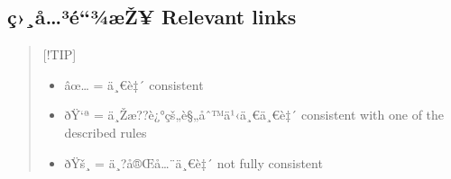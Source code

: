 \subsection{ç›¸å\ldots³é``¾æŽ¥ Relevant
links}\label{uxe7uxe5uxb3uxe9uxbeuxe6ux17e-relevant-links}

\begin{quote}
{[}!TIP{]}

\begin{itemize}
\tightlist
\item
  âœ\ldots{} = ä¸€è‡´ consistent
\item
  ðŸ`ª = ä¸Žæ??è¿°çš„è§„åˆ™ä¹‹ä¸€ä¸€è‡´ consistent with one of the
  described rules
\item
  ðŸš¸ = ä¸?å®Œå\ldots¨ä¸€è‡´ not fully consistent
\end{itemize}
\end{quote}

